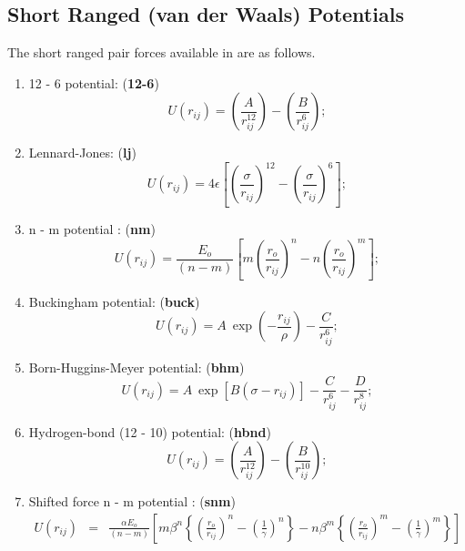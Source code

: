 \subsection{Short Ranged (van der Waals) Potentials}
\label{vdwpot}

The short ranged pair forces available in \D{} are as
follows.

\begin{enumerate}
\item 12 - 6 potential: ({\bf 12-6})
\begin{equation}
U(r_{ij})=\left(\frac{A}{r_{ij}^{12}}\right)-\left(\frac{B}{r_{ij}^{6}}\right);
\end{equation}
\item Lennard-Jones: ({\bf lj})
\begin{equation}
U(r_{ij})=4\epsilon\left[\left
(\frac{\sigma}{r_{ij}}\right)^{12}-\left(\frac{\sigma}{r_{ij}}\right)^{6}\right
];
\end{equation}
\item n - m potential \cite{clarke-86a}: ({\bf nm})
\begin{equation}
U(r_{ij})=\frac{E_{o}}{(n-m)}\left[m\left 
(\frac{r_{o}}{r_{ij}}\right)^{n}-n\left(\frac{r_{o}}{r_{ij}}\right)^{m}\right
];
\end{equation}
\item Buckingham potential: ({\bf buck})
\begin{equation}
U(r_{ij})=A~\exp\left(-\frac{r_{ij}}{\rho}\right)-\frac{C}{r_{ij}^{6}};
\end{equation}
\item Born-Huggins-Meyer potential: ({\bf bhm})
\begin{equation}
U(r_{ij})=A~\exp[B(\sigma-r_{ij})]-\frac{C}{r_{ij}^{6}}-\frac{D}{r_{ij}^{8}};
\end{equation}
\item Hydrogen-bond (12 - 10) potential: ({\bf hbnd})
\begin{equation}
U(r_{ij})=\left(\frac{A}{r_{ij}^{12}}\right)-\left(\frac{B}{r_{ij}^{10}}\right);
\end{equation}
\item Shifted force n - m potential \cite{clarke-86a}: ({\bf snm})
\begin{eqnarray}
U(r_{ij})&=&\frac{\alpha E_{o}}{(n-m)}\left [
m\beta^{n}\left \{ \left (\frac{r_{o}}{r_{ij}}\right )^{n}-
\left(\frac{1}{\gamma}\right)^{n}\right \}-
n\beta^{m}\left \{ \left (\frac{r_{o}}{r_{ij}}\right )^{m}-
\left(\frac{1}{\gamma}\right)^{m}\right \} \right ]\nonumber \\

\end{eqnarray}
\end{enumerate}

